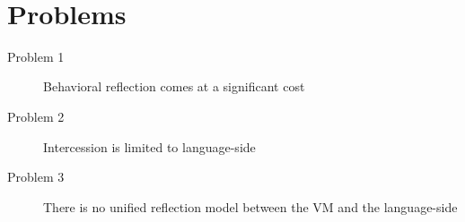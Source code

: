 \\

\section{Problems}
\begin{description}
	\item[Problem 1] Behavioral reflection comes at a significant cost
	\item[Problem 2] Intercession is limited to language-side
	\item[Problem 3] There is no unified reflection model between the VM and the language-side
\end{description}

